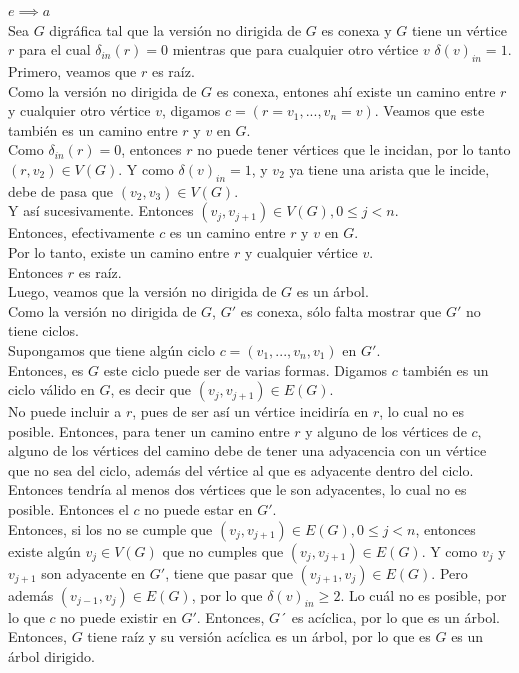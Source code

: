 \documentclass[12pt,a4paper]{report}
\begin{document}
\begin{enumerate}
{			$e \implies a$\\
			Sea $G$ digráfica tal que la versión no dirigida de $G$ es conexa y $G$
			tiene un vértice $r$ para el cual $\delta_{in}(r) = 0$ mientras que para
			cualquier otro vértice $v$ $\delta(v)_{in} = 1$.\\
			Primero, veamos que $r$ es raíz.\\
			Como la versión no dirigida de $G$ es conexa, entones ahí existe un camino
			entre $r$ y cualquier otro vértice $v$, digamos $c = (r = v_1, ..., v_n = v)$.
			Veamos que este también es un camino entre $r$ y $v$ en $G$.\\
			Como $\delta_{in}(r) = 0$, entonces $r$ no puede tener vértices que le incidan,
			por lo tanto $(r, v_2) \in V(G)$. Y como $\delta(v)_{in} = 1$, y $v_2$ ya
			tiene una arista que le incide, debe de pasa que $(v_2, v_3) \in V(G)$.\\
			Y así sucesivamente. Entonces $(v_j, v_{j+1}) \in V(G), 0 \leq j < n$.\\
			Entonces, efectivamente $c$ es un camino entre $r$ y $v$ en $G$.\\
			Por lo tanto, existe un camino entre $r$ y cualquier vértice $v$.\\
			Entonces $r$ es raíz.\\
			Luego, veamos que la versión no dirigida de $G$ es un árbol.\\
			Como la versión no dirigida de $G$, $G'$ es conexa, sólo falta mostrar que
			$G'$ no tiene ciclos.\\
			Supongamos que tiene algún ciclo $c = (v_1, ..., v_n, v_1)$ en $G'$.\\
			Entonces, es $G$ este ciclo puede ser de varias formas. Digamos $c$ también
			es un ciclo válido en $G$, es decir que $(v_j, v_{j+1}) \in E(G)$.\\
			No puede incluir a $r$, pues de ser así un vértice incidiría en $r$, lo
			cual no es posible. Entonces, para tener un camino entre $r$ y alguno de
			los vértices de $c$, alguno de los vértices del camino debe de tener una
			adyacencia con un vértice que no sea del ciclo, además del vértice al que
			es adyacente dentro del ciclo. Entonces tendría al menos dos vértices que
			le son adyacentes, lo cual no es posible. Entonces el $c$ no puede estar
			en $G'$.\\
			Entonces, si los no se cumple que $(v_j, v_{j+1}) \in E(G), 0 \leq j < n$,
			entonces existe algún $v_j \in V(G)$ que no cumples que
			$(v_j, v_{j+1})\in E(G)$. Y como $v_j$ y $v_{j+1}$ son adyacente en $G'$,
			tiene que pasar que $(v_{j+1}, v_j)\in E(G)$.
			Pero además $(v_{j-1}, v_j)\in E(G)$, por lo que $\delta(v)_{in} \geq 2$.
			Lo cuál no es posible, por lo que $c$ no puede existir en $G'$.
			Entonces, $G´$ es acíclica, por lo que es un árbol.
			Entonces, $G$ tiene raíz y su versión acíclica es un árbol, por lo que es
			$G$ es un árbol dirigido.

		}
	\end{enumerate}
\end{document}
